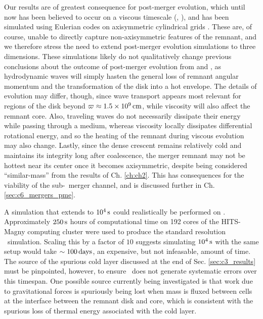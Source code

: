 Our results are of greatest consequence for post-merger evolution, which until now has been believed to occur on a viscous timescale (\citeal{vkercj10}, \citealt{shen+12}), and has been simulated using Eulerian codes on axisymmetric cylindrical grids \citep{schw+12,ji+13}.  These are, of course, unable to directly capture non-axisymmetric features of the remnant, and we therefore stress the need to extend post-merger evolution simulations to three dimensions.  {\charles These simulations} likely do not qualitatively change previous conclusions about the outcome of post-merger evolution from \cite{schw+12} and \cite{ji+13}, as hydrodynamic waves will simply hasten the general loss of remnant angular momentum and the transformation of the disk into a hot envelope.  The details of evolution may differ, though, since wave transport appears most relevant for regions of the disk beyond $\varpi \approx 1.5\times10^9\,\mathrm{cm}$, while viscosity will also affect the remnant core.  Also, traveling waves do not necessarily dissipate their energy while passing through a medium, whereas viscosity locally dissipates differential rotational energy, and so the heating of the remnant during viscous evolution may also change.  Lastly, since the dense crescent remains relatively cold and maintains its integrity long after coalescence, the merger remnant may not be hottest near its center once it becomes axisymmetric, despite being considered ``similar-mass'' from the results of Ch. \ref{ch:ch2}.  This has consequences for the viability of the sub-\Mch\ merger channel, and is discussed further in Ch. \ref{sec:c6_mergers_pme}.

{\charles A simulation that extends to $10^4\,\mathrm{s}$ could realistically be performed on \arepo.  Approximately $250\,\mathrm{s}$ hours of computational time on 192 cores of the HITS-Magny computing cluster were used to produce the standard resolution \arepo\ simulation.  Scaling this by a factor of $10$ suggests simulating $10^4\,\mathrm{s}$ with the same setup would take $\sim100\,\mathrm{days}$, an expensive, but not infeasable, amount of time.  The source of the spurious cold layer discussed at the end of Sec. \ref{sec:c3_results} must be pinpointed, however, to ensure \arepo\ does not generate systematic errors over this timespan.  One possible source currently being investigated is that work due to gravitational forces is spuriously being lost when mass is fluxed between cells at the interface between the remnant disk and core, which is consistent with the spurious loss of thermal energy associated with the cold layer.}

